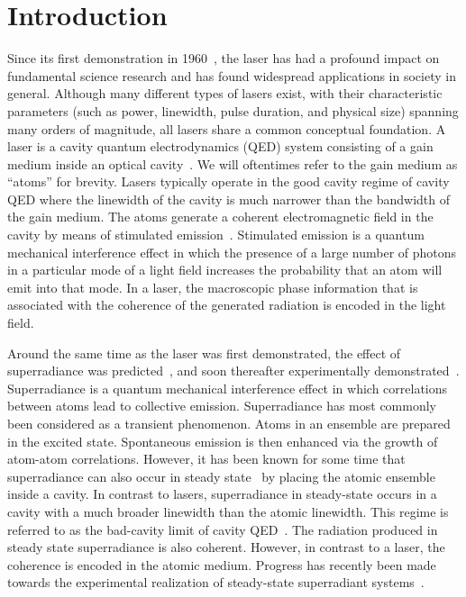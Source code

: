 \documentclass[aps,
twocolumn,
showpacs,
superscriptaddress,groupedaddress]{revtex4}
\begin{document}


\maketitle


\section{Introduction}

Since its first demonstration in 1960~\cite{maiman1960stimulated}, the
laser has had a profound impact on fundamental science research and has
found widespread applications in society in general.  Although many
different types of lasers exist, with their characteristic parameters
(such as power, linewidth, pulse duration, and physical size) spanning
many orders of magnitude, all lasers share a common conceptual
foundation.  A laser is a cavity quantum electrodynamics (QED) system
consisting of a gain medium inside an optical
cavity~\cite{meystre2007elements}.  We will oftentimes refer to the gain
medium as ``atoms'' for brevity.  Lasers typically operate in the good
cavity regime of cavity QED where the linewidth of the cavity is much
narrower than the bandwidth of the gain medium.  The atoms generate a
coherent electromagnetic field in the cavity by means of stimulated
emission~\cite{PhysRev.112.1940}.  Stimulated emission is a quantum
mechanical interference effect in which the presence of a large number
of photons in a particular mode of a light field increases the
probability that an atom will emit into that mode. In a laser, the
macroscopic phase information that is associated with the coherence of
the generated radiation is encoded in the light field.

Around the same time as the laser was first demonstrated, the effect
of superradiance was predicted~\cite{PhysRev.93.99}, and soon
thereafter experimentally demonstrated~\cite{harocheSuperradiance}.
Superradiance is a quantum mechanical interference effect in which
correlations between atoms lead to collective emission.  Superradiance
has most commonly been considered as a transient phenomenon.  Atoms in
an ensemble are prepared in the excited state.  Spontaneous emission
is then enhanced via the growth of atom-atom correlations.  However,
it has been known for some time that superradiance can also occur in
steady state~\cite{PhysRevLett.102.163601, PhysRevA.81.033847,
  PhysRevA.81.063827,PhysRevLett.89.253003} by placing the atomic
ensemble inside a cavity.  In contrast to lasers, superradiance in
steady-state occurs in a cavity with a much broader linewidth than the
atomic linewidth.  This regime is referred to as the bad-cavity limit
of cavity QED~\cite{PhysRevA.51.809, PhysRevLett.72.3815,
  ChenDeliciousLaser, HakenLaser, HakenLaserBook}.  The radiation
produced in steady state superradiance is also coherent.  However, in
contrast to a laser, the coherence is encoded in the atomic medium.
Progress has recently been made towards the experimental realization
of steady-state superradiant
systems~\cite{ThompsonPaper,bohnet2012relaxation,Norcia:Crossover}.
\end{document}
